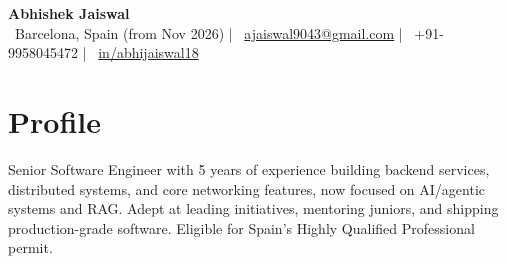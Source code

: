 \documentclass[10pt,a4paper]{article}
\begin{document}
\begin{center}
  {\LARGE\bfseries\color{accentblue} Abhishek Jaiswal}\\[4pt]
  {\small
    \faMapMarker*\ Barcelona, Spain (from Nov 2026)
    \quad|\quad
    \faEnvelope\ \href{mailto:ajaiswal9043@gmail.com}{ajaiswal9043@gmail.com}
    \quad|\quad
    \faPhone\ +91-9958045472
    \quad|\quad
    \faLinkedin\ \href{https://linkedin.com/in/abhijaiswal18}{in/abhijaiswal18}
  }
\end{center}
\vspace{4pt}
\section{Profile}
{Senior Software Engineer with 5 years of experience building backend services, distributed systems, and core networking features, now focused on AI/agentic systems and RAG. Adept at leading initiatives, mentoring juniors, and shipping production-grade software. Eligible for Spain's Highly Qualified Professional permit.}
\vspace{6pt}
\setlength{\columnsep}{0.8cm}
\end{document}
